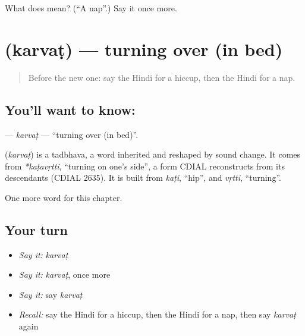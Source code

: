 \begin{tcolorbox}[breakable,colback=teal!4,colframe=teal!35!black,title={Before you move on}]
What does  mean? (\textquotedblleft{}A nap\textquotedblright{}.) Say it once more.
\end{tcolorbox}
\section[\texorpdfstring{\hi{करवट} (karvaṭ)}{करवट (karvaṭ)}]{ (karvaṭ) — turning over (in bed)}

\label{lesson:HI-C275-karvat}



\begin{quote}
Before the new one: say the Hindi for a hiccup, then the Hindi for a nap.
\end{quote}

\subsection*{You'll want to know: }
\textbf{} — \emph{karvaṭ} — \textquotedblleft{}turning over (in bed)\textquotedblright{}.

\begin{cousinweb}
\textbf{} (\emph{karvaṭ}) is a tadbhava, a word inherited and reshaped by sound change. It comes from \emph{*kaṭavṛtti}, \textquotedblleft{}turning on one's side\textquotedblright{}, a form CDIAL reconstructs from its descendants (CDIAL 2635). It is built from \emph{kaṭi}, \textquotedblleft{}hip\textquotedblright{}, and \emph{vṛtti}, \textquotedblleft{}turning\textquotedblright{}.
\end{cousinweb}

\begin{grammarlens}[title={What you've built}]
One more word for this chapter.
\end{grammarlens}

\subsection*{Your turn}
\begin{itemize}
\raggedright
  \item \emph{Say it:} \emph{karvaṭ}
  \item \emph{Say it:} \emph{karvaṭ}, once more
  \item \emph{Say it:} say \emph{karvaṭ}
  \item \emph{Recall:} say the Hindi for a hiccup, then the Hindi for a nap, then say \emph{karvaṭ} again
\end{itemize}


